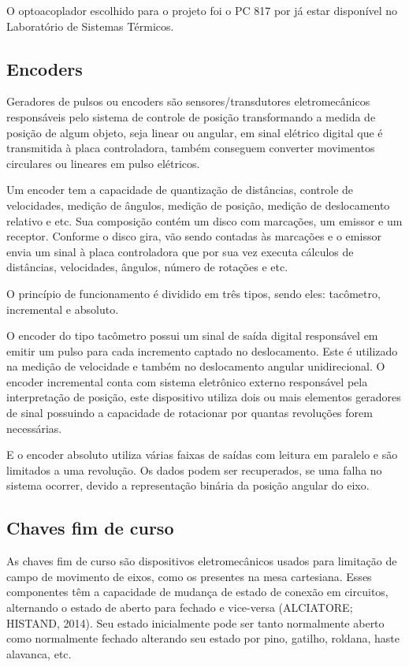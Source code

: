 O optoacoplador escolhido para o projeto foi o PC 817 por já estar disponível no Laboratório de Sistemas 
Térmicos.

\subsection{Encoders}

Geradores de pulsos ou encoders são sensores/transdutores eletromecânicos responsáveis pelo sistema de 
controle de posição transformando a medida de posição de algum objeto, seja linear ou angular, em sinal 
elétrico digital que é transmitida à placa controladora, também conseguem converter movimentos circulares 
ou lineares em pulso elétricos.

Um encoder tem a capacidade de quantização de distâncias, controle de velocidades, medição de ângulos, 
medição de posição, medição de deslocamento relativo e etc. Sua composição contém um disco com marcações, 
um emissor e um receptor. Conforme o disco gira, vão sendo contadas às marcações e o emissor envia um sinal 
à placa controladora que por sua vez executa cálculos de distâncias, velocidades, ângulos, número de rotações 
e etc.

O princípio de funcionamento é dividido em três tipos, sendo eles: tacômetro, incremental e absoluto.

O encoder do tipo tacômetro possui um sinal de saída digital responsável em emitir um pulso para cada 
incremento captado no deslocamento. Este é utilizado na medição de velocidade e também no deslocamento 
angular unidirecional. O encoder incremental conta com sistema eletrônico externo responsável pela 
interpretação de posição, este dispositivo utiliza dois ou mais elementos geradores de sinal possuindo 
a capacidade de rotacionar por quantas revoluções forem necessárias.

E o encoder absoluto utiliza várias faixas de saídas com leitura em paralelo e são limitados a uma revolução. 
Os dados podem ser recuperados, se uma falha no sistema ocorrer, devido a representação binária da posição 
angular do eixo.

\subsection{Chaves fim de curso}

As chaves fim de curso são dispositivos eletromecânicos usados para limitação de campo de movimento de eixos, 
como os presentes na mesa cartesiana. Esses componentes têm a capacidade de mudança de estado de conexão 
em circuitos, alternando o estado de aberto para fechado e vice-versa (ALCIATORE; HISTAND, 2014). 
Seu estado inicialmente pode ser tanto normalmente aberto como normalmente fechado alterando seu estado 
por pino, gatilho, roldana, haste alavanca, etc. 

